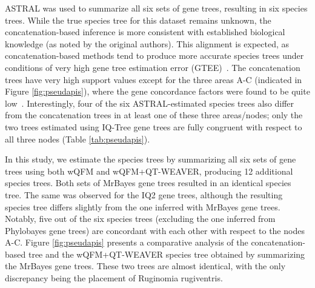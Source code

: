 \documentclass[10pt,a4paper]{article}
\newcommand{\add}[1]{{\color{blue} #1}}
\newcommand{\addb}[1]{{\color{red} #1}}
\begin{document}
ASTRAL was used to summarize all six sets of gene trees, resulting in six species trees. %
While the true species tree for this dataset remains unknown, the concatenation-based inference is more consistent with established biological knowledge (as noted by the original authors). This alignment is expected, as concatenation-based methods tend to produce more accurate species trees under conditions of very high gene tree estimation error (GTEE)~\cite{bayzid2013naive, molloy2018include, mirarab2019species}. %
The concatenation trees have very high support values except for the three areas A-C (indicated in Figure \ref{fig:pseudapis}), where the gene concordance factors were found to be quite low~\cite{bossert2021gene}. Interestingly, four of the six ASTRAL-estimated species trees also differ from the concatenation trees in at least one of these three areas/nodes; only the two trees estimated using IQ-Tree gene trees are fully congruent with respect to all three nodes (Table \ref{tab:pseudapis}). %

  

In this study, we estimate the species trees by summarizing all six sets of gene trees using both wQFM and wQFM+QT-WEAVER, producing 12 additional species trees. Both sets of MrBayes gene trees resulted in an identical species tree. The same was observed for the IQ2 gene trees, although the resulting species tree differs slightly from the one inferred with MrBayes gene trees. Notably, five out of the six species trees (excluding the one inferred from Phylobayes gene trees) are concordant with each other with respect to the nodes A-C.
Figure \ref{fig:pseudapis} presents a comparative analysis of the concatenation-based tree and the wQFM+QT-WEAVER species tree obtained by summarizing the MrBayes gene trees.
 These two trees are almost identical, with the only discrepancy being the placement of Ruginomia rugiventris.
\end{document}
